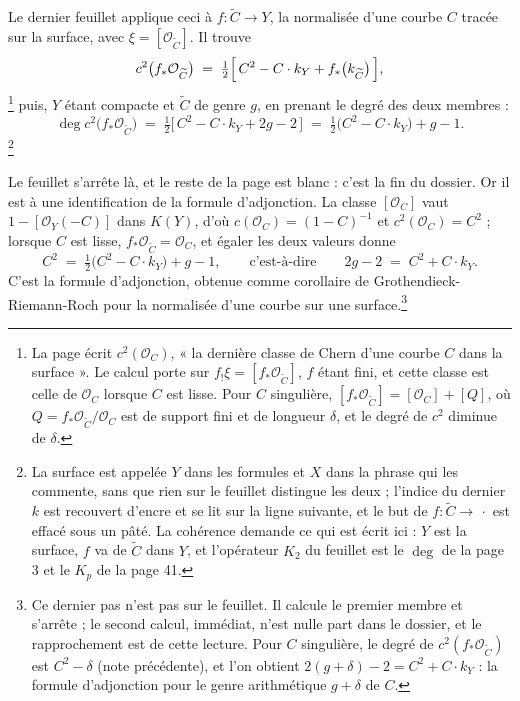\documentclass[11pt,a4paper]{article}
\begin{document}
Le dernier feuillet applique ceci à $f : \widetilde{C} \to Y$, la normalisée
d'une courbe $C$ tracée sur la surface, avec $\xi = [\mathcal{O}_{\widetilde{C}}]$.
Il trouve
\[
  c^{2}\bigl(f_{*}\mathcal{O}_{\widetilde{C}}\bigr) \;=\; \tfrac{1}{2}
  \Bigl[\,C^{2} - C\cdot k_{Y} + f_{*}\bigl(k_{\widetilde{C}}\bigr)\,\Bigr],
\]
\footnote{La page écrit $c^{2}(\mathcal{O}_{C})$, « la dernière classe de
Chern d'une courbe $C$ dans la surface ». Le calcul porte sur $f_{!}\xi =
[f_{*}\mathcal{O}_{\widetilde{C}}]$, $f$ étant fini, et cette classe est celle
de $\mathcal{O}_{C}$ lorsque $C$ est lisse. Pour $C$ singulière,
$[f_{*}\mathcal{O}_{\widetilde{C}}] = [\mathcal{O}_{C}] + [Q]$, où $Q =
f_{*}\mathcal{O}_{\widetilde{C}}/\mathcal{O}_{C}$ est de support fini et de
longueur $\delta$, et le degré de $c^{2}$ diminue de $\delta$.}
puis, $Y$ étant compacte et $\widetilde{C}$ de genre $g$, en prenant le degré
des deux membres :
\[
  \deg c^{2}\bigl(f_{*}\mathcal{O}_{\widetilde{C}}\bigr)
  \;=\; \tfrac{1}{2}\bigl[\,C^{2} - C\cdot k_{Y} + 2g - 2\,\bigr]
  \;=\; \tfrac{1}{2}\bigl(C^{2} - C\cdot k_{Y}\bigr) + g - 1 .
\]
\footnote{La surface est appelée $Y$ dans les formules et $X$ dans la phrase qui
les commente, sans que rien sur le feuillet distingue les deux ; l'indice du
dernier $k$ est recouvert d'encre et se lit sur la ligne suivante, et le but de
$f : \widetilde{C} \to \,\cdot$ est effacé sous un pâté. La cohérence
demande ce qui est écrit ici : $Y$ est la surface, $f$ va de $\widetilde{C}$
dans $Y$, et l'opérateur $K_{2}$ du feuillet est le $\deg$ de la page 3 et le
$K_{p}$ de la page 41.}

Le feuillet s'arrête là, et le reste de la page est blanc : c'est la fin du
dossier. Or il est à une identification de la formule d'adjonction. La classe
$[\mathcal{O}_{C}]$ vaut $1 - [\mathcal{O}_{Y}(-C)]$ dans $K(Y)$, d'où
$c(\mathcal{O}_{C}) = (1-C)^{-1}$ et $c^{2}(\mathcal{O}_{C}) = C^{2}$ ; lorsque
$C$ est lisse, $f_{*}\mathcal{O}_{\widetilde{C}} = \mathcal{O}_{C}$, et égaler
les deux valeurs donne
\[
  C^{2} \;=\; \tfrac{1}{2}\bigl(C^{2} - C\cdot k_{Y}\bigr) + g - 1,
  \qquad \text{c'est-à-dire} \qquad
  2g - 2 \;=\; C^{2} + C\cdot k_{Y} .
\]
C'est la formule d'adjonction, obtenue comme corollaire de
Grothendieck-Riemann-Roch pour la normalisée d'une courbe sur une
surface.\footnote{Ce dernier pas n'est pas sur le feuillet. Il calcule le
premier membre et s'arrête ; le second calcul, immédiat, n'est nulle part dans
le dossier, et le rapprochement est de cette lecture. Pour $C$ singulière, le degré de
$c^{2}(f_{*}\mathcal{O}_{\widetilde{C}})$ est $C^{2} - \delta$ (note
précédente), et l'on obtient $2(g + \delta) - 2 = C^{2} + C\cdot k_{Y}$ : la
formule d'adjonction pour le genre arithmétique $g + \delta$ de $C$.}
\end{document}
